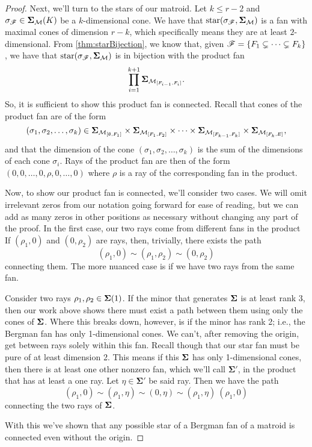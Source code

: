 \documentclass[12pt,oneside]{../../sfsuthesis}
\begin{document}
\begin{proof}
    Next, we'll turn to the stars of our matroid.
    Let \( k \leq r - 2 \) and \( \sigma_{\mathscr{F}} \in \bm{\Sigma}_{\mathcal{M}}(K) \) be a \( k \)-dimensional cone.
    We have that \( \operatorname{star}( \sigma_{\mathscr{F}}, \bm{\Sigma}_{\mathcal{M}}) \) is a fan with maximal cones of dimension \( r - k \), which specifically means they are at least \( 2 \)-dimensional.
    From \th\ref{thm:starBijection}, we know that, given \( \mathscr{F} = \{ F_1 \subsetneq \cdots \subsetneq F_k \} \), we have that \( \operatorname{star}( \sigma_{\mathscr{F}}, \bm{\Sigma}_{\mathcal{M}}) \) is in bijection with the product fan
    \[
        \prod_{i = 1}^{k+1} \bm{\Sigma}_{\mathcal{M}_{[F_{i-1}, F_i]}}.
    \]
    So, it is sufficient to show this product fan is connected.
    Recall that cones of the product fan are of the form
    \[
        (\sigma_1, \sigma_2, \dots, \sigma_k) \in \bm{\Sigma}_{\mathcal{M}_{[\emptyset, F_1]}} \times \bm{\Sigma}_{\mathcal{M}_{[F_{1}, F_2]}} \times \cdots \times \bm{\Sigma}_{\mathcal{M}_{[F_{k-1}, F_k]}} \times \bm{\Sigma}_{\mathcal{M}_{[F_{k}, E]}},
    \]
    and that the dimension of the cone \( (\sigma_1, \sigma_2, \dots, \sigma_k) \) is the sum of the dimensions of each cone \( \sigma_i \).
    Rays of the product fan are then of the form \( (0, 0, \dots, 0,  \rho, 0, \dots, 0) \) where \( \rho \) is a ray of the corresponding fan in the product.

    Now, to show our product fan is connected, we'll consider two cases.
    We will omit irrelevant zeros from our notation going forward for ease of reading, but we can add as many zeros in other positions as necessary without changing any part of the proof.
    In the first case, our two rays come from different fans in the product
    If \( (\rho_1, 0) \) and \( (0, \rho_2) \) are rays, then, trivially, there exists the path
    \[
        (\rho_1, 0) \sim (\rho_1, \rho_2) \sim (0, \rho_2)
    \]
    connecting them.
    The more nuanced case is if we have two rays from the same fan.

    Consider two rays \( \rho_1, \rho_2 \in \bm{\Sigma}(1)\).
    If the minor that generates \( \bm{\Sigma} \) is at least rank 3, then our work above shows there must exist a path between them using only the cones of \( \bm{\Sigma} \).
    Where this breaks down, however, is if the minor has rank 2; i.e., the Bergman fan has only 1-dimensional cones.
    We can't, after removing the origin, get between rays solely within this fan.
    Recall though that our star fan must be pure of at least dimension 2.
    This means if this \(\bm{\Sigma} \) has only 1-dimensional cones, then there is at least one other nonzero fan, which we'll call \( \bm{\Sigma'} \), in the product that has at least a one ray.
    Let \( \eta \in  \bm{\Sigma'} \) be said ray.
    Then we have the path
    \[
        (\rho_1, 0) \sim (\rho_1, \eta) \sim (0, \eta) \sim (\rho_1, \eta) ~ (\rho_1, 0)
    \]
    connecting the two rays of \( \bm{\Sigma} \).

    With this we've shown that any possible star of a Bergman fan of a matroid is connected even without the origin.
\end{proof}
\end{document}
